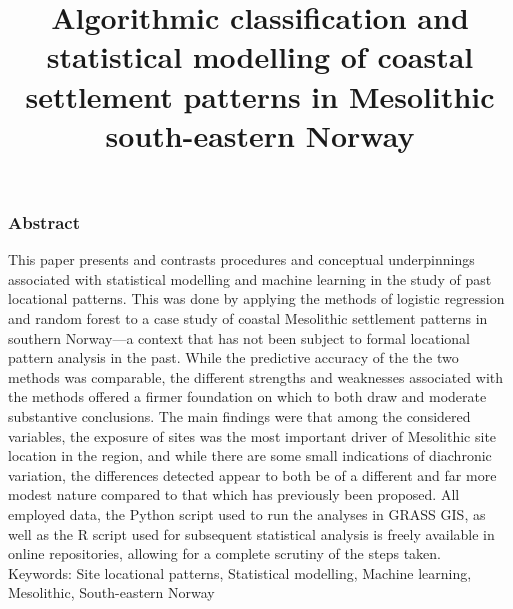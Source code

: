 \documentclass[12pt, a4paper]{article}
\title{Algorithmic classification and statistical modelling of coastal settlement patterns in Mesolithic south-eastern Norway}
\date{}
\author{}
\begin{document}
\maketitle
\subsubsection*{Abstract}
This paper presents and contrasts procedures and conceptual underpinnings associated with statistical modelling and machine learning in the study of past locational patterns. This was done by applying the methods of logistic regression and random forest to a case study of coastal Mesolithic settlement patterns in southern Norway---a context that has not been subject to formal locational pattern analysis in the past. While the predictive accuracy of the the two methods was comparable, the different strengths and weaknesses associated with the methods offered a firmer foundation on which to both draw and moderate substantive conclusions. The main findings were that among the considered variables, the exposure of sites was the most important driver of Mesolithic site location in the region, and while there are some small indications of diachronic variation, the differences detected appear to both be of a different and far more modest nature compared to that which has previously been proposed. All employed data, the Python script used to run the analyses in GRASS GIS, as well as the R script used for subsequent statistical analysis is freely available in online repositories, allowing for a complete scrutiny of the steps taken. \\

Keywords: Site locational patterns, Statistical modelling, Machine learning, Mesolithic, South-eastern Norway
\end{document}

